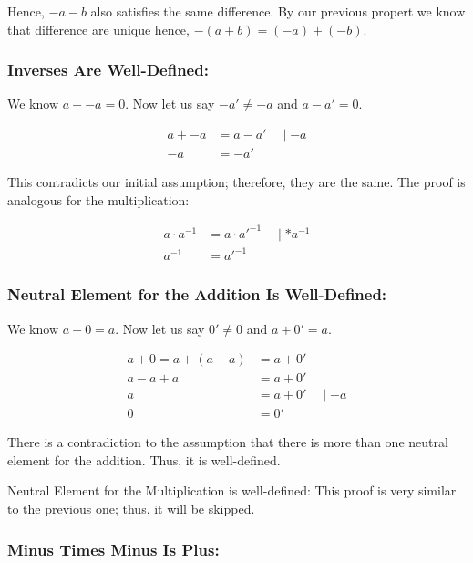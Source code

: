Hence, \(-a - b\) also satisfies the same difference. By our previous propert we know that 
difference are unique hence, \(-(a + b) = (-a) + (-b)\).

\QED

\subsubsection{Inverses Are Well-Defined:}

We know \(a + -a = 0\). Now let us say \(-a' \ne -a\) and \(a -a' = 0\).

\begin{align*}
    a + -a  &= a - a' \quad \mid - a \\ 
        -a &= -a'
\end{align*}

This contradicts our initial assumption; therefore, they are the same. The proof is analogous for the multiplication:

\begin{align*}
    a \cdot a^{-1} &= a \cdot a'^{-1} \quad \mid * a^{-1} \\ 
    a^{-1}  &= a'^{-1} 
\end{align*}

\QED

\subsubsection{Neutral Element for the Addition Is Well-Defined:}

We know \(a + 0 = a\). Now let us say \(0' \ne 0\) and \(a + 0' = a\).

\begin{align*}
  a + 0 = a + (a - a) &=  a + 0' \\ 
          a - a + a   &= a + 0' \\
           a   &= a + 0' \quad \mid -a \\ 
           0 &= 0'
\end{align*}

There is a contradiction to the assumption that there is more than one neutral element for the addition. Thus, 
it is well-defined.

Neutral Element for the Multiplication is well-defined: This proof is 
very similar to the previous one; thus, it will be skipped. 

\QED

\subsubsection{Minus Times Minus Is Plus:}

